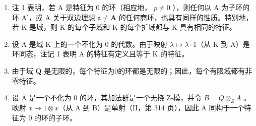 \begin{enumerate}
\def\labelenumi{\arabic{enumi})}
\setcounter{enumi}{1}
\item
  注 1 表明，若 A 是特征为 0 的环（相应地， \(p \neq 0\) ），则任何以 A 为子环的环 A'，或 A 关于双边理想 \(\mathfrak{a} \neq \mathbf{A}\) 的任何商环，也具有同样的性质。特别地，若 K 是域，则 K 的每个子域和 K 的每个扩域都与 K 具有相同的特征。
\item
  设 A 是域 K 上的一个不化为 0 的代数。由于映射 \(\lambda \mapsto \lambda \cdot 1\)（从 K 到 A）是环同态，注记 1 表明 A 的特征有定义且等于 K 的特征。
\item
  由于域 \(\mathbf{Q}\) 是无限的，每个特征为0的环都是无限的；因此，每个有限域都有非零特征。
\item
  设 A 是一个不化为 0 的环，其加法群是一个无挠 Z-模，并令 \(B = Q \otimes_{Z} A\) 。映射 \(x \mapsto 1 \otimes x\)（从 A 到 B）是单射（II，第 314 页），因此 A 同构于一个特征为 0 的环的子环。
\end{enumerate}

